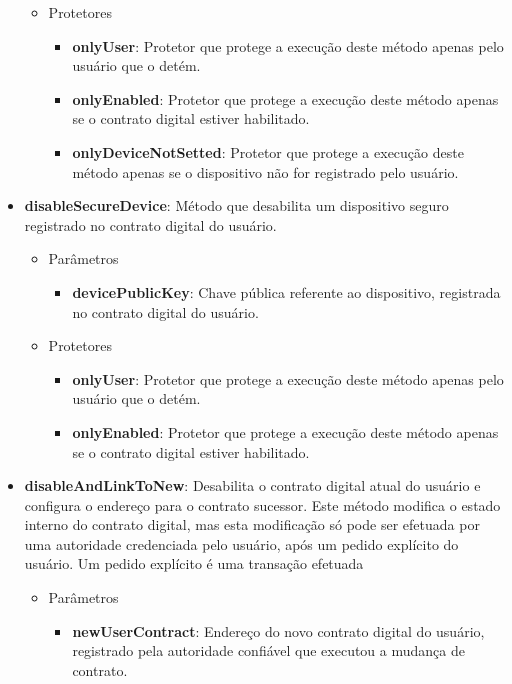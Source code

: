 \documentclass[tcc,capa]{texufpel}
\begin{document}
\begin{itemize}
\begin{itemize}
            \item Protetores
            \begin{itemize}
                \item \textbf{onlyUser}: Protetor que protege a execução deste método apenas pelo usuário que o detém.
                \item \textbf{onlyEnabled}: Protetor que protege a execução deste método apenas se o contrato digital estiver habilitado.
                \item \textbf{onlyDeviceNotSetted}: Protetor que protege a execução deste método apenas se o dispositivo não for registrado pelo usuário.
            \end{itemize}
        \end{itemize}
        
        \item \textbf{disableSecureDevice}: Método que desabilita um dispositivo seguro registrado no contrato digital do usuário.
        \begin{itemize}
            \item Parâmetros
            \begin{itemize}
                \item \textbf{devicePublicKey}: Chave pública referente ao dispositivo, registrada no contrato digital do usuário.
            \end{itemize}
            
            \item Protetores
            \begin{itemize}
                \item \textbf{onlyUser}: Protetor que protege a execução deste método apenas pelo usuário que o detém.
                \item \textbf{onlyEnabled}: Protetor que protege a execução deste método apenas se o contrato digital estiver habilitado.
            \end{itemize}
        \end{itemize}
        
        \item \textbf{disableAndLinkToNew}: Desabilita o contrato digital atual do usuário e configura o endereço para o contrato sucessor. Este método modifica o estado interno do contrato digital, mas esta modificação só pode ser efetuada por uma autoridade credenciada pelo usuário, após um pedido explícito do usuário. Um pedido explícito é uma transação efetuada 
        \begin{itemize}
            \item Parâmetros
            \begin{itemize}
                \item \textbf{newUserContract}: Endereço do novo contrato digital do usuário, registrado pela autoridade confiável que executou a mudança de contrato.
            \end{itemize}
            

\end{itemize}
\end{itemize}
\end{document}
